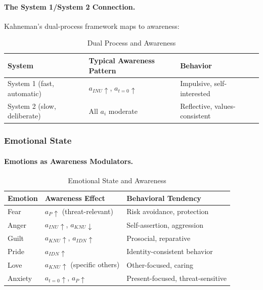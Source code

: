 \paragraph{The System 1/System 2 Connection.}
Kahneman's dual-process framework maps to awareness:

\begin{table}[htbp]
\centering
\caption{Dual Process and Awareness}
\label{tab:dual-process}
\renewcommand{\arraystretch}{1.3}
\begin{tabular}{@{}lll@{}}
\toprule
\textbf{System} & \textbf{Typical Awareness Pattern} & \textbf{Behavior} \\
\midrule
System 1 (fast, automatic) & $a_{INU} \uparrow$, $a_{t=0} \uparrow$ & Impulsive, self-interested \\
System 2 (slow, deliberate) & All $a_i$ moderate & Reflective, values-consistent \\
\bottomrule
\end{tabular}
\end{table}

\subsubsection{Emotional State}

\paragraph{Emotions as Awareness Modulators.}

\begin{table}[htbp]
\centering
\caption{Emotional State and Awareness}
\label{tab:emotion-awareness}
\renewcommand{\arraystretch}{1.3}
\begin{tabular}{@{}lll@{}}
\toprule
\textbf{Emotion} & \textbf{Awareness Effect} & \textbf{Behavioral Tendency} \\
\midrule
Fear & $a_P \uparrow$ (threat-relevant) & Risk avoidance, protection \\
Anger & $a_{INU} \uparrow$, $a_{KNU} \downarrow$ & Self-assertion, aggression \\
Guilt & $a_{KNU} \uparrow$, $a_{IDN} \uparrow$ & Prosocial, reparative \\
Pride & $a_{IDN} \uparrow$ & Identity-consistent behavior \\
Love & $a_{KNU} \uparrow$ (specific others) & Other-focused, caring \\
Anxiety & $a_{t=0} \uparrow$, $a_{P} \uparrow$ & Present-focused, threat-sensitive \\
\bottomrule
\end{tabular}
\end{table}

